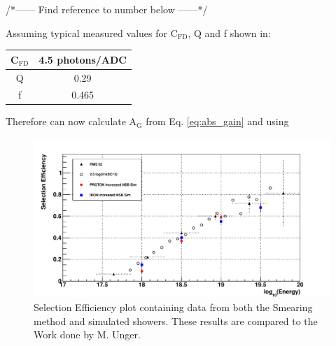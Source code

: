 /*------ Find reference to number below ------*/

Assuming typical measured values for C$_{\mathrm{FD}}$, Q and f shown in:

\begin{center}
\begin{tabular}{|c|c|}
\hline
C$_{\mathrm{FD}}$ & 4.5 photons/ADC \\
\hline
Q & 0.29 \\
\hline
f & 0.465 \\
\hline
\end{tabular}
\end{center}

Therefore can now calculate A$_{\mathrm{G}}$ from Eq. \ref{eq:abs_gain} and using 

\begin{figure}[!hp]
\centering
\includegraphics[width=\textwidth]{chapters/graphs/SelectionEff/SelectionEff_errorbars_10timesNSB.pdf}
\caption{Selection Efficiency plot containing data from both the Smearing method and simulated showers. These results are compared to the Work done by M. Unger.}
\end{figure}

